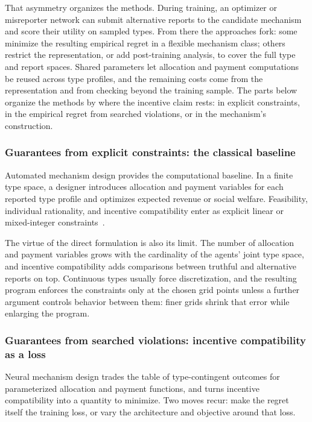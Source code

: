 That asymmetry organizes the methods. During training, an optimizer or misreporter
network can submit alternative reports to the candidate mechanism and score their
utility on sampled types. From there the approaches fork: some minimize the
resulting empirical regret in a flexible mechanism class; others restrict the
representation, or add post-training analysis, to cover the full type and report
spaces. Shared parameters let allocation and payment computations be reused across
type profiles, and the remaining costs come from the representation and from
checking beyond the training sample. The parts below organize the methods by where the incentive claim rests: in explicit
constraints, in the empirical regret from searched violations, or in the mechanism's construction.

\subsubsection{Guarantees from explicit constraints: the classical baseline}

Automated mechanism design provides the computational baseline. In a finite type
space, a designer introduces allocation and payment variables for each reported
type profile and optimizes expected revenue or social welfare. Feasibility,
individual rationality, and incentive compatibility enter as explicit linear or
mixed-integer constraints~\citep{ConitzerSandholm2002,CurryAMDSurvey2025}.

The virtue of the direct formulation is also its limit. The number of allocation
and payment variables grows with the cardinality of the agents' joint type space,
and incentive compatibility adds comparisons between truthful and alternative
reports on top. Continuous types usually force discretization, and the resulting
program enforces the constraints only at the chosen grid points unless a further argument controls behavior between them: finer grids shrink
that error while enlarging the program.

\subsubsection{Guarantees from searched violations: incentive compatibility as a loss}

Neural mechanism design trades the table of type-contingent outcomes for
parameterized allocation and payment functions, and turns incentive compatibility
into a quantity to minimize. Two moves recur: make the regret itself the training
loss, or vary the architecture and objective around that loss.

